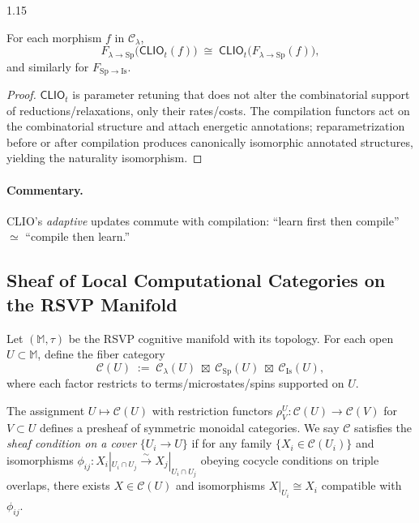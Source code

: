 \documentclass[12pt,a4paper]{article}
\begin{document}
\begin{spacing}{1.15}
\begin{lemma}
\label{lem:naturality}
For each morphism $f$ in $\mathcal{C}_{\lambda}$,
\[
F_{\lambda\to\mathrm{Sp}}\big(\mathsf{CLIO}_{t}(f)\big)
\;\cong\;
\mathsf{CLIO}_{t}\big(F_{\lambda\to\mathrm{Sp}}(f)\big),
\]
and similarly for $F_{\mathrm{Sp}\to\mathrm{Is}}$.
\end{lemma}

\begin{proof}
$\mathsf{CLIO}_{t}$ is parameter retuning that does not alter the combinatorial support of reductions/relaxations, only their rates/costs. The compilation functors act on the combinatorial structure and attach energetic annotations; reparametrization before or after compilation produces canonically isomorphic annotated structures, yielding the naturality isomorphism.
\end{proof}

\paragraph{Commentary.}
CLIO’s \emph{adaptive} updates commute with compilation: “learn first then compile” $\simeq$ “compile then learn.”

\subsection{Sheaf of Local Computational Categories on the RSVP Manifold}

Let $(\mathbb{M},\tau)$ be the RSVP cognitive manifold with its topology. For each open $U\subset \mathbb{M}$, define the fiber category
\[
\mathscr{C}(U)\;:=\;
\mathcal{C}_{\lambda}(U)\;\boxtimes\; \mathcal{C}_{\mathrm{Sp}}(U)\;\boxtimes\; \mathcal{C}_{\mathrm{Is}}(U),
\]
where each factor restricts to terms/microstates/spins supported on $U$.

\begin{definition}
The assignment $U\mapsto\mathscr{C}(U)$ with restriction functors $\rho^{U}_{V}\colon \mathscr{C}(U)\to\mathscr{C}(V)$ for $V\subset U$ defines a presheaf of symmetric monoidal categories. We say $\mathscr{C}$ satisfies the \emph{sheaf condition on a cover} $\{U_i\to U\}$ if for any family $\{X_i\in \mathscr{C}(U_i)\}$ and isomorphisms $\phi_{ij}\colon X_i|_{U_i\cap U_j}\xrightarrow{\sim} X_j|_{U_i\cap U_j}$ obeying cocycle conditions on triple overlaps, there exists $X\in \mathscr{C}(U)$ and isomorphisms $X|_{U_i}\cong X_i$ compatible with $\phi_{ij}$.
\end{definition}


\end{spacing}
\end{document}
